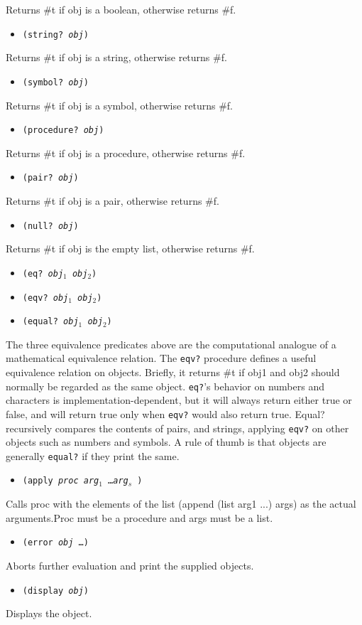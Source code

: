 \documentclass{article}
\begin{document}
Returns \#t if obj is a boolean, otherwise returns \#f.
\begin{itemize}
\item \texttt{(string? \textit{obj})}
\end{itemize}
Returns \#t if obj is a string, otherwise returns \#f.
\begin{itemize}
\item \texttt{(symbol? \textit{obj})}
\end{itemize}
Returns \#t if obj is a symbol, otherwise returns \#f.
\begin{itemize}
\item \texttt{(procedure? \textit{obj})}
\end{itemize}
Returns \#t if obj is a procedure, otherwise returns \#f.
\begin{itemize}
\item \texttt{(pair? \textit{obj})}
\end{itemize}
Returns \#t if obj is a pair, otherwise returns \#f.
\begin{itemize}
\item \texttt{(null? \textit{obj})}
\end{itemize}
Returns \#t if obj is the empty list, otherwise returns \#f.
\begin{itemize}
\item \texttt{(eq? \textit{obj}$_1$ \textit{obj}$_2$)}
\item \texttt{(eqv? \textit{obj}$_1$ \textit{obj}$_2$)}
\item \texttt{(equal? \textit{obj}$_1$ \textit{obj}$_2$)}
\end{itemize}
The three equivalence predicates above are the computational analogue of a mathematical equivalence relation. The \texttt{eqv?} procedure defines a useful equivalence relation
on objects. Briefly, it returns #t if obj1 and obj2 should normally be regarded as the
same object. \texttt{eq?}'s behavior on numbers and characters is implementation-dependent, but
it will always return either true or false, and will return true only when \texttt{eqv?} would
also return true. Equal? recursively compares the contents of pairs, and strings,
applying \texttt{eqv?} on other objects such as numbers and symbols. A rule of thumb is that
objects are generally \texttt{equal?} if they print the same.\\
\begin{itemize}
\item \texttt{(apply \textit{proc} \textit{arg}$_1$ \dots \textit{arg}$_s$ )}
\end{itemize}
Calls proc with the elements of the list (append (list arg1 ...) args) as the actual arguments.Proc must be a procedure and args must be a list.
\begin{itemize}
\item \texttt{(error \textit{obj} \dots)}
\end{itemize}
Aborts further evaluation and print the supplied objects.
\begin{itemize}
\item \texttt{(display \textit{obj})}
\end{itemize}
Displays the object.
\end{document}
